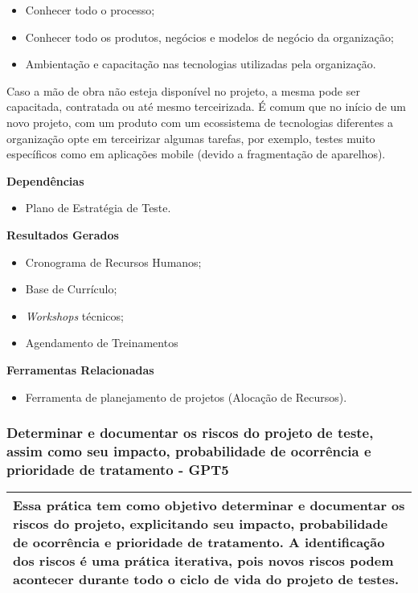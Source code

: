 \begin{itemize}
    \item Conhecer todo o processo;
    \item Conhecer todo os produtos, negócios e modelos de negócio da organização;
    \item Ambientação e capacitação nas tecnologias utilizadas pela organização.
\end{itemize}

Caso a mão de obra não esteja disponível no projeto, a mesma pode ser capacitada, contratada ou até mesmo terceirizada. É comum que no início de um novo projeto, com um produto com um ecossistema de tecnologias diferentes a organização opte em terceirizar algumas tarefas, por exemplo, testes muito específicos como em aplicações mobile (devido a fragmentação de aparelhos).

\textbf{Dependências}
\begin{itemize}
    \item Plano de Estratégia de Teste.
\end{itemize}

\textbf{Resultados Gerados}
\begin{itemize}
    \item Cronograma de Recursos Humanos;
    \item Base de Currículo;
    \item \textit{Workshops} técnicos;
    \item Agendamento de Treinamentos
\end{itemize}

\textbf{Ferramentas Relacionadas}
\begin{itemize}
    \item Ferramenta de planejamento de projetos (Alocação de Recursos).
\end{itemize}

\subsubsection{Determinar e documentar os riscos do projeto de teste, assim como seu impacto, probabilidade de ocorrência e prioridade de tratamento - GPT5}
\label{sec:gpt5}

\begin{table}[!ht]
\centering
\begin{tabular}{|p{130mm}|}
\hline
Essa prática tem como objetivo determinar e documentar os riscos do projeto, explicitando seu impacto, probabilidade de ocorrência e prioridade de tratamento. A identificação dos riscos é uma prática iterativa, pois novos riscos podem acontecer durante todo o ciclo de vida do projeto de testes. \\ 
\hline
\end{tabular}
\end{table}

